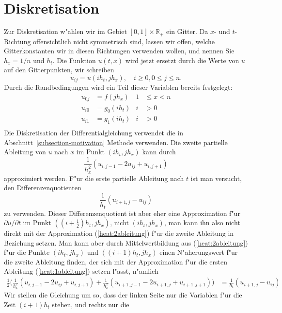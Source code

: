 \section{Diskretisation\label{heat:section-diskretisation}}
Zur Diskretisation w"ahlen wir im Gebiet $[0,1]\times \mathbb R_+$ ein
Gitter. 
Da $x$- und $t$-Richtung offensichtlich nicht symmetrisch sind,
lassen wir offen, welche Gitterkonstanten wir in diesen Richtungen
verwenden wollen, und nennen Sie $h_x=1/n$ und $h_t$. 
Die Funktion $u(t,x)$ wird jetzt ersetzt durch die Werte von $u$ auf
den Gitterpunkten, wir schreiben
\[
u_{ij} = u(ih_t, jh_x),\quad i\ge 0, 0\le j \le n.
\]
Durch die Randbedingungen wird ein Teil dieser Variablen bereits
festgelegt:
\begin{align*}
u_{0j}&=f(jh_x)&1&\le x < n\\
u_{i0}&=g_0(ih_t)&i&>0\\
u_{i1}&=g_1(ih_t)&i&>0\\
\end{align*}
Die Diskretisation der Differentialgleichung verwendet die in
Abschnitt~\ref{subsection-motivation} Methode verwenden.
Die zweite partielle Ableitung von $u$ nach $x$ im Punkt $(ih_t, jh_x)$ 
kann durch
\begin{equation}
\frac1{h_x^2}(u_{i,j-1}-2u_{ij}+u_{i,j+1})
\label{heat:2ableitung}
\end{equation}
approximiert werden.
F"ur die erste partielle Ableitung nach $t$ ist man versucht,
den Differenzenquotienten
\begin{equation}
\frac1{h_t}(u_{i+1,j}-u_{ij})
\label{heat:1ableitung}
\end{equation}
zu verwenden.
Dieser Differenzenquotient ist aber eher eine Approximation f"ur
$\partial u/\partial t$ im Punkt $((i+\frac12)h_t, jh_x)$,
nicht $(ih_t,jh_x)$, man kann ihn also nicht direkt mit der
Approximation (\ref{heat:2ableitung}) f"ur die zweite Ableitung
in Beziehung setzen.
Man kann aber durch Mittelwertbildung aus (\ref{heat:2ableitung}) f"ur
die Punkte $(ih_t, jh_x)$ und $((i+1)h_t, jh_x)$ einen N"aherungswert
f"ur die zweite Ableitung finden, der sich mit der Approximation
f"ur die ersten Ableitung (\ref{heat:1ableitung}) setzen l"asst,
n"amlich
\begin{align}
\frac12\biggl(
\frac1{h_x^2}(u_{i,j-1}-2u_{ij}+u_{i,j+1})
+
\frac1{h_x^2}(u_{i+1,j-1}-2u_{i+1,j}+u_{i+1,j+1})
\biggr)
&=
\frac1{h_t}(u_{i+1,j}-u_{ij})
\label{heat:diskret}
\end{align}
Wir stellen die Gleichung um so, dass der linken Seite nur die 
Variablen f"ur die Zeit $(i+1)h_t$ stehen, und rechts nur die
